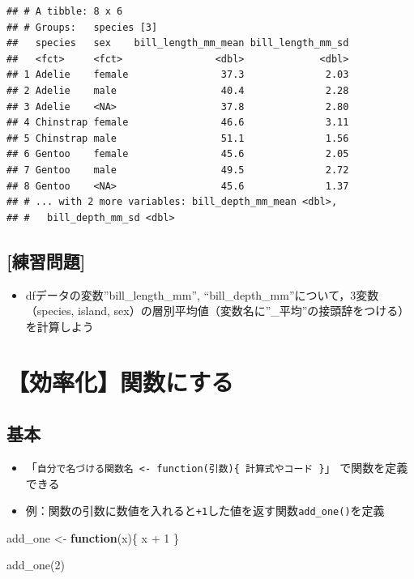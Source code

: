 \documentclass[
  xelatex,ja=standard, b5paper]{bxjsbook}
\newenvironment{Shaded}{\begin{snugshade}}{\end{snugshade}}
\newcommand{\ControlFlowTok}[1]{\textcolor[rgb]{0.13,0.29,0.53}{\textbf{#1}}}
\newcommand{\DecValTok}[1]{\textcolor[rgb]{0.00,0.00,0.81}{#1}}
\newcommand{\FunctionTok}[1]{\textcolor[rgb]{0.00,0.00,0.00}{#1}}
\newcommand{\NormalTok}[1]{#1}
\newcommand{\OtherTok}[1]{\textcolor[rgb]{0.56,0.35,0.01}{#1}}
\newcommand{\SpecialCharTok}[1]{\textcolor[rgb]{0.00,0.00,0.00}{#1}}
\providecommand{\tightlist}{%
  \setlength{\itemsep}{0pt}\setlength{\parskip}{0pt}}
\begin{document}
\begin{verbatim}
## # A tibble: 8 x 6
## # Groups:   species [3]
##   species   sex    bill_length_mm_mean bill_length_mm_sd
##   <fct>     <fct>                <dbl>             <dbl>
## 1 Adelie    female                37.3              2.03
## 2 Adelie    male                  40.4              2.28
## 3 Adelie    <NA>                  37.8              2.80
## 4 Chinstrap female                46.6              3.11
## 5 Chinstrap male                  51.1              1.56
## 6 Gentoo    female                45.6              2.05
## 7 Gentoo    male                  49.5              2.72
## 8 Gentoo    <NA>                  45.6              1.37
## # ... with 2 more variables: bill_depth_mm_mean <dbl>,
## #   bill_depth_mm_sd <dbl>
\end{verbatim}

\hypertarget{ux7df4ux7fd2ux554fux984c-16}{%
\subsection{{[}練習問題{]}}\label{ux7df4ux7fd2ux554fux984c-16}}

\begin{itemize}
\tightlist
\item
  dfデータの変数''bill\_length\_mm'', ``bill\_depth\_mm''について，3変数（species, island, sex）の層別平均値（変数名に''\_平均''の接頭辞をつける）を計算しよう
\end{itemize}

\hypertarget{su-fun}{%
\section{【効率化】関数にする}\label{su-fun}}

\hypertarget{su-fun-st}{%
\subsection{基本}\label{su-fun-st}}

\begin{itemize}
\tightlist
\item
  「\texttt{自分で名づける関数名\ \textless{}-\ function(引数)\{\ 計算式やコード\ \}}」 で関数を定義できる
\item
  例：関数の引数に数値を入れると\texttt{+1}した値を返す関数\texttt{add\_one()}を定義
\end{itemize}

\begin{Shaded}
\begin{Highlighting}[]
\NormalTok{add\_one }\OtherTok{\textless{}{-}} 
  \ControlFlowTok{function}\NormalTok{(x)\{}
\NormalTok{    x }\SpecialCharTok{+} \DecValTok{1}
\NormalTok{  \}}

\FunctionTok{add\_one}\NormalTok{(}\DecValTok{2}\NormalTok{)}
\end{Highlighting}
\end{Shaded}
\end{document}
